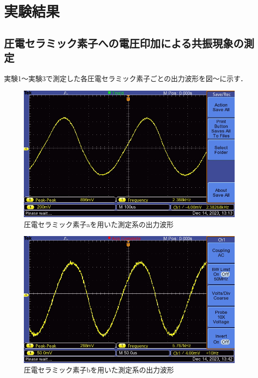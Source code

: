 \documentclass{ltjsarticle}
\begin{document}
\section{実験結果}
	\subsection{圧電セラミック素子への電圧印加による共振現象の測定}
		実験1～実験3で測定した各圧電セラミック素子ごとの出力波形を図～に示す．
		\begin{figure}[H]
		\centering
		\includegraphics[width = 12cm]{figs/week4big.JPG}
		\caption{圧電セラミック素子aを用いた測定系の出力波形}
		\label{fig:圧電a}
		\end{figure}

		\begin{figure}[H]
		\centering
		\includegraphics[width = 12cm]{figs/week4mid.JPG}
		\caption{圧電セラミック素子bを用いた測定系の出力波形}
		\label{fig:圧電b}
		\end{figure}
\end{document}

